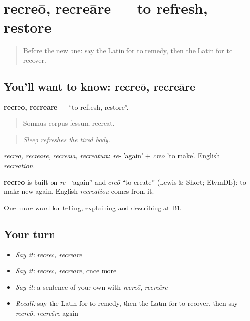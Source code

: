 \section[recreō, recreāre]{recreō, recreāre — to refresh, restore}

\label{lesson:LA-C526-recreo}



\begin{quote}
Before the new one: say the Latin for to remedy, then the Latin for to recover.
\end{quote}

\subsection*{You'll want to know: recreō, recreāre}
\textbf{recreō, recreāre} — \textquotedblleft{}to refresh, restore\textquotedblright{}.

\begin{quote}
Somnus corpus fessum recreat.
\end{quote}

\begin{quote}
\emph{Sleep refreshes the tired body.}
\end{quote}

\emph{recreō, recreāre, recreāvī, recreātum}: \emph{re-} 'again' + \emph{creō} 'to make'. English \emph{recreation}.

\begin{cousinweb}
\textbf{recreō} is built on \emph{re-} \textquotedblleft{}again\textquotedblright{} and \emph{creō} \textquotedblleft{}to create\textquotedblright{} (Lewis \& Short; EtymDB): to make new again. English \emph{recreation} comes from it.
\end{cousinweb}

\begin{grammarlens}[title={What you've built}]
One more word for telling, explaining and describing at B1.
\end{grammarlens}

\subsection*{Your turn}
\begin{itemize}
\raggedright
  \item \emph{Say it:} \emph{recreō, recreāre}
  \item \emph{Say it:} \emph{recreō, recreāre}, once more
  \item \emph{Say it:} a sentence of your own with \emph{recreō, recreāre}
  \item \emph{Recall:} say the Latin for to remedy, then the Latin for to recover, then say \emph{recreō, recreāre} again
\end{itemize}

